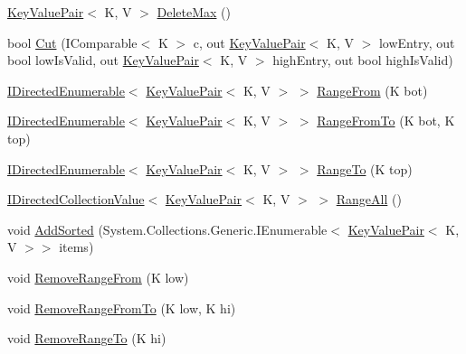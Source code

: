\begin{DoxyCompactItemize}
\hyperlink{struct_c5_1_1_key_value_pair}{Key\+Value\+Pair}$<$ K, V $>$ \hyperlink{class_c5_1_1_guarded_sorted_dictionary_a92b4a99e4067dba655cb186db659f707}{Delete\+Max} ()
\item 
bool \hyperlink{class_c5_1_1_guarded_sorted_dictionary_afd5cb3c0cd691c8e8dab675861bc3328}{Cut} (I\+Comparable$<$ K $>$ c, out \hyperlink{struct_c5_1_1_key_value_pair}{Key\+Value\+Pair}$<$ K, V $>$ low\+Entry, out bool low\+Is\+Valid, out \hyperlink{struct_c5_1_1_key_value_pair}{Key\+Value\+Pair}$<$ K, V $>$ high\+Entry, out bool high\+Is\+Valid)
\item 
\hyperlink{interface_c5_1_1_i_directed_enumerable}{I\+Directed\+Enumerable}$<$ \hyperlink{struct_c5_1_1_key_value_pair}{Key\+Value\+Pair}$<$ K, V $>$ $>$ \hyperlink{class_c5_1_1_guarded_sorted_dictionary_a68330eda6bdc72c6db469bcbf50187cf}{Range\+From} (K bot)
\item 
\hyperlink{interface_c5_1_1_i_directed_enumerable}{I\+Directed\+Enumerable}$<$ \hyperlink{struct_c5_1_1_key_value_pair}{Key\+Value\+Pair}$<$ K, V $>$ $>$ \hyperlink{class_c5_1_1_guarded_sorted_dictionary_ac83908f5c0cdb2cc9ea56e1ace8a885a}{Range\+From\+To} (K bot, K top)
\item 
\hyperlink{interface_c5_1_1_i_directed_enumerable}{I\+Directed\+Enumerable}$<$ \hyperlink{struct_c5_1_1_key_value_pair}{Key\+Value\+Pair}$<$ K, V $>$ $>$ \hyperlink{class_c5_1_1_guarded_sorted_dictionary_ac8000944dfb9e67507e05e02f6817101}{Range\+To} (K top)
\item 
\hyperlink{interface_c5_1_1_i_directed_collection_value}{I\+Directed\+Collection\+Value}$<$ \hyperlink{struct_c5_1_1_key_value_pair}{Key\+Value\+Pair}$<$ K, V $>$ $>$ \hyperlink{class_c5_1_1_guarded_sorted_dictionary_a58cb3b60cc28c3eb6e2bfbcb15d94f77}{Range\+All} ()
\item 
void \hyperlink{class_c5_1_1_guarded_sorted_dictionary_a8416822f568f078afa22b63b3d0d54f3}{Add\+Sorted} (System.\+Collections.\+Generic.\+I\+Enumerable$<$ \hyperlink{struct_c5_1_1_key_value_pair}{Key\+Value\+Pair}$<$ K, V $>$$>$ items)
\item 
void \hyperlink{class_c5_1_1_guarded_sorted_dictionary_ab248a29f9178874604ac2679273aa464}{Remove\+Range\+From} (K low)
\item 
void \hyperlink{class_c5_1_1_guarded_sorted_dictionary_a5900826397cc5997c91845695de842b5}{Remove\+Range\+From\+To} (K low, K hi)
\item 
void \hyperlink{class_c5_1_1_guarded_sorted_dictionary_a8c9d699464fa0641698dfd289bd17fd6}{Remove\+Range\+To} (K hi)
\end{DoxyCompactItemize}
